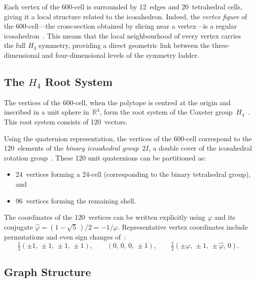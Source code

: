 \documentclass[12pt,a4paper]{article}
\newcommand{\Hfour}{H_4}
\newcommand{\Hthree}{H_3}
\newcommand{\vphi}{\varphi}
\newcommand{\R}{\mathbb{R}}
\begin{document}
Each vertex of the 600-cell is surrounded by 12~edges and 20~tetrahedral
cells, giving it a local structure related to the icosahedron.  Indeed, the
\emph{vertex figure} of the 600-cell---the cross-section obtained by slicing
near a vertex---is a regular icosahedron~\cite{coxeter1991}.  This means that
the local neighbourhood of every vertex carries the full $\Hthree$ symmetry,
providing a direct geometric link between the three-dimensional and
four-dimensional levels of the symmetry ladder.

\subsection{The \texorpdfstring{$\Hfour$}{H4} Root System}

The vertices of the 600-cell, when the polytope is centred at the origin and
inscribed in a unit sphere in~$\R^4$, form the root system of the Coxeter
group~$\Hfour$~\cite{coxeter1988,moody1993}.  This root system consists of
120~vectors.

Using the quaternion representation, the vertices of the 600-cell correspond
to the 120~elements of the \emph{binary icosahedral group}~$2I$, a double
cover of the icosahedral rotation group~\cite{conway2003}.  These 120 unit
quaternions can be partitioned as:
\begin{itemize}[nosep]
  \item 24~vertices forming a 24-cell (corresponding to the binary
    tetrahedral group), and
  \item 96~vertices forming the remaining shell.
\end{itemize}

The coordinates of the 120~vertices can be written explicitly using $\vphi$
and its conjugate $\hat\vphi = (1-\sqrt{5}\,)/2 = -1/\vphi$.  Representative
vertex coordinates include permutations and even sign changes
of~\cite{wilson2009}:
\begin{equation}\label{eq:600cell_coords}
  \tfrac{1}{2}(\pm 1,\,\pm 1,\,\pm 1,\,\pm 1),
  \qquad
  (0,\,0,\,0,\,\pm 1),
  \qquad
  \tfrac{1}{2}(\pm\vphi,\,\pm 1,\,\pm\hat\vphi,\,0).
\end{equation}

\subsection{Graph Structure}
\end{document}
